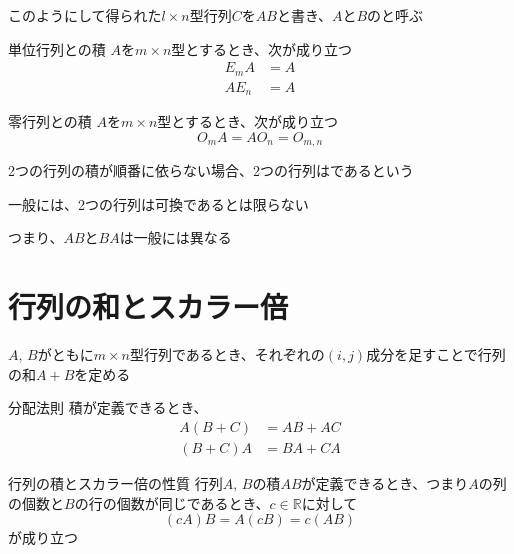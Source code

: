 \documentclass[../../../topic_linear-algebra]{subfiles}
\begin{document}
\br

このようにして得られた$l \times n$型行列$C$を$AB$と書き、$A$と$B$のと呼ぶ

\sectionline

\begin{theorem*}{単位行列との積}
  $A$を$m \times n$型とするとき、次が成り立つ
  \begin{align*}
    E_mA & = A \\
    AE_n & = A
  \end{align*}
\end{theorem*}

\begin{theorem*}{零行列との積}
  $A$を$m \times n$型とするとき、次が成り立つ
  \begin{equation*}
    O_m A = A O_n = O_{m,n}
  \end{equation*}
\end{theorem*}

\sectionline

2つの行列の積が順番に依らない場合、2つの行列はであるという

\br

一般には、2つの行列は可換であるとは限らない

つまり、$AB$と$BA$は一般には異なる

\br


\sectionline
\section{行列の和とスカラー倍}

$A, \, B$がともに$m \times n$型行列であるとき、それぞれの$(i, j)$成分を足すことで行列の和$A + B$を定める

\begin{theorem*}{分配法則}
  積が定義できるとき、
  \begin{align*}
    A(B + C) & = AB + AC \\
    (B + C)A & = BA + CA
  \end{align*}
\end{theorem*}

\begin{theorem*}{行列の積とスカラー倍の性質}
  行列$A,\,B$の積$AB$が定義できるとき、つまり$A$の列の個数と$B$の行の個数が同じであるとき、$c \in \mathbb{R}$に対して
  \begin{equation*}
    (cA)B = A(cB) = c(AB)
  \end{equation*}
  が成り立つ
\end{theorem*}
\end{document}
